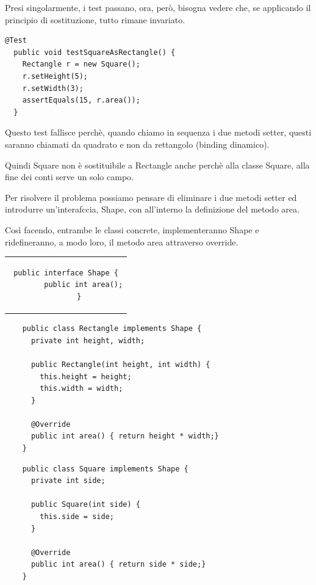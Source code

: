 Presi singolarmente, i test passano, ora, però, bisogna vedere che, se applicando il principio di sostituzione, tutto rimane invariato.\\
\begin{lstlisting}[linewidth=8cm]
  @Test
  public void testSquareAsRectangle() {
    Rectangle r = new Square();
    r.setHeight(5);
    r.setWidth(3);
    assertEquals(15, r.area());
  }
\end{lstlisting}

Questo test fallisce perchè, quando chiamo in sequenza i due metodi setter, questi saranno chiamati da quadrato e non da rettangolo (binding dinamico).

Quindi Square non è sostituibile a Rectangle anche perchè alla classe Square, alla fine dei conti serve un solo campo.

Per risolvere il problema possiamo pensare di eliminare i due metodi setter ed introdurre un'interafccia, Shape, con all'interno la definizione del metodo area.

Così facendo, entrambe le classi concrete, implementeranno Shape e ridefineranno, a modo loro, il metodo area attraverso override.

\begin{center}
  \begin{tabular}{c}
    \begin{lstlisting}[linewidth=5cm]
      public interface Shape {
        public int area();
      }
  \end{lstlisting}
  \end{tabular}
\end{center}

\begin{multicols}{2}
  \begin{lstlisting}
    public class Rectangle implements Shape {
      private int height, width;
      
      public Rectangle(int height, int width) {
        this.height = height;
        this.width = width;
      }

      @Override
      public int area() { return height * width;}
    }
  \end{lstlisting}
  \columnbreak
  \begin{lstlisting}
    public class Square implements Shape {
      private int side;
      
      public Square(int side) {
        this.side = side;
      }
      
      @Override
      public int area() { return side * side;}
    }
  \end{lstlisting}
\end{multicols}

